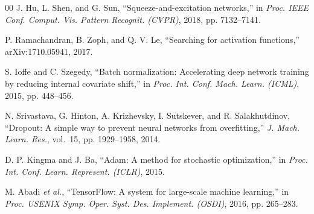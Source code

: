 \documentclass[conference]{IEEEtran}
\begin{document}
\begin{thebibliography}{00}
 J. Hu, L. Shen, and G. Sun, ``Squeeze-and-excitation networks,''
in \emph{Proc. IEEE Conf. Comput. Vis. Pattern Recognit. (CVPR)}, 2018,
pp. 7132--7141.

 P. Ramachandran, B. Zoph, and Q. V. Le, ``Searching for
activation functions,'' arXiv:1710.05941, 2017.

 S. Ioffe and C. Szegedy, ``Batch normalization: Accelerating
deep network training by reducing internal covariate shift,'' in \emph{Proc. Int.
Conf. Mach. Learn. (ICML)}, 2015, pp. 448--456.

 N. Srivastava, G. Hinton, A. Krizhevsky, I. Sutskever, and
R. Salakhutdinov, ``Dropout: A simple way to prevent neural networks from
overfitting,'' \emph{J. Mach. Learn. Res.}, vol.~15, pp. 1929--1958, 2014.

 D. P. Kingma and J. Ba, ``Adam: A method for stochastic
optimization,'' in \emph{Proc. Int. Conf. Learn. Represent. (ICLR)}, 2015.

 M. Abadi \emph{et al.}, ``TensorFlow: A system for large-scale
machine learning,'' in \emph{Proc. USENIX Symp. Oper. Syst. Des. Implement.
(OSDI)}, 2016, pp. 265--283.

\end{thebibliography}
\end{document}
